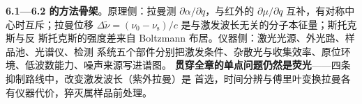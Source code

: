 \begin{methodsum}
\textbf{6.1—6.2 的方法骨架}。原理侧：拉曼测 $\partial\alpha/\partial q$，与红外的
$\partial\mu/\partial q$ 互补，有对称中心时互斥；拉曼位移
$\Delta\tilde\nu=(\nu_0-\nu_{\mathrm{s}})/c$ 是与激发波长无关的分子本征量；斯托克斯与反
斯托克斯的强度差来自 Boltzmann 布居。仪器侧：激光光源、外光路、样品池、光谱仪、检测
系统五个部件分别把激发条件、杂散光与收集效率、原位环境、低波数能力、噪声来源写进谱图。
\textbf{贯穿全章的单点问题仍然是荧光}——四条抑制路线中，改变激发波长（紫外拉曼）是
首选，时间分辨与傅里叶变换拉曼各有仪器代价，猝灭属样品前处理。
\end{methodsum}

